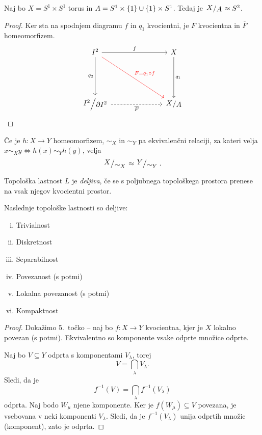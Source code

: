 \begin{zgled}
Naj bo $X = S^1 \times S^1$ torus in
$A = S^1 \times \left\{1\right\} \cup \left\{1\right\} \times S^1$. Tedaj je
$\kvoc{X}{A} \approx S^2$.
\end{zgled}

\begin{proof}
Ker sta na spodnjem diagramu $f$ in $q_1$ kvocientni, je $F$
kvocientna in $\overline{F}$ homeomorfizem.
\[
\begin{tikzcd}[column sep=large, row sep=large]
I^2 \arrow[rr, "f"] \arrow[dd, "q_2"'] \arrow[ddrr, red, "F = q_1 \circ f"] & & X \arrow[dd, "q_1"]\\
\\
\kvoc{I^2}{\partial I^2} \arrow[rr, dashrightarrow, "\overline{F}"'] & & \kvoc{X}{A}
\end{tikzcd} \qedhere
\]
\end{proof}

\begin{opomba}
Če je $h \colon X \to Y$ homeomorfizem, $\sim_X$ in $\sim_Y$ pa
ekvivalenčni relaciji, za kateri velja
$x \sim_X y \iff h(x) \sim_Y h(y)$, velja
\[
\kvoc{X}{\sim_X} \approx \kvoc{Y}{\sim_Y}.
\]
\end{opomba}

\begin{definicija}
Topološka lastnost $L$ je
\emph{deljiva}, če se s
poljubnega topološkega prostora prenese na vsak njegov kvocientni
prostor.
\end{definicija}

\begin{trditev}
Naslednje topološke lastnosti so deljive:

\begin{multicols}{2}
\begin{enumerate}[i)]
\item Trivialnost
\item Diskretnost
\item Separabilnost
\item Povezanost (s potmi)
\item Lokalna povezanost (s potmi)
\item Kompaktnost
\end{enumerate}
\end{multicols}
\end{trditev}

\begin{proof}
Dokažimo 5.~točko -- naj bo $f \colon X \to Y$ kvocientna, kjer je
$X$ lokalno povezan (s potmi). Ekvivalentno so komponente vsake
odprte množice odprte.

Naj bo $V \subseteq Y$ odprta s komponentami $V_\lambda$, torej
\[
V = \bigcap_\lambda  V_\lambda.
\]
Sledi, da je
\[
f^{-1}(V) = \bigcap_\lambda f^{-1}\left( V_\lambda \right)
\]
odprta. Naj bodo $W_\mu$ njene komponente. Ker je
$f(W_\mu) \subseteq V$ povezana, je vsebovana v neki komponenti
$V_\lambda$. Sledi, da je $f^{-1}\left( V_\lambda \right)$ unija
odprtih množic (komponent), zato je odprta.
\end{proof}

